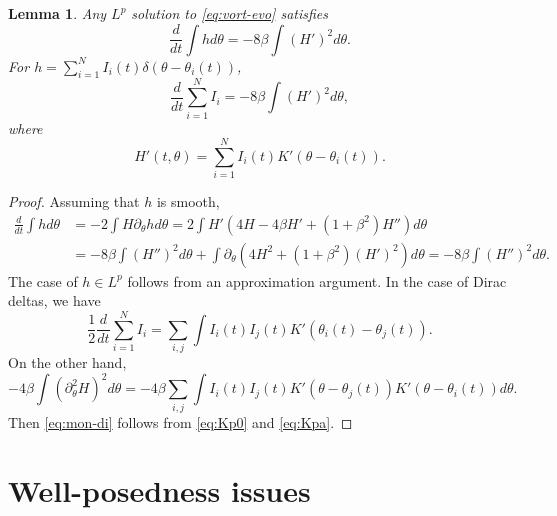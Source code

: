 \documentclass[JEP,XML,SOM,Unicode,NoFloatCountersInSection,published]{cedram}
\theoremstyle{plain}
\newtheorem{lemma}[theorem]{Lemma}
\theoremstyle{definition}
\let\rd\partial
\let\bt\beta
\let\dlt\delta
\let\tht\theta
\begin{document}

\begin{lemma}\label{lem:mon}
Any $L^p$ solution to \eqref{eq:vort-evo} satisfies\vspace*{-3pt}
\begin{equation}\label{eq:mon}
\frac{d}{dt} \int h d\tht = -8\bt \int (H')^2 d\tht.
\end{equation}
For $h = \sum_{i=1}^{N} I_i(t) \dlt(\tht-\tht_i(t))$,\vspace*{-3pt}
\begin{equation}\label{eq:mon-di}
\frac{d}{dt} \sum_{i=1}^{N} I_{i} = - 8\bt \int (H')^2 d\tht,
\end{equation}
where\vspace*{-3pt}
\begin{equation*}
H'(t,\tht) = \sum_{i=1}^{N} I_i(t) K'(\tht-\tht_i(t)).
\end{equation*}
\end{lemma}
\begin{proof}
Assuming that $h$ is smooth,\vspace*{-3pt}
\begin{equation*}
\begin{split}
\frac{d}{dt} \int h d\tht & = -2 \int H\rd_\tht h d\tht = 2\int H' (4H - 4\bt H' + (1+\bt^2) H'') d\tht \\
& = -8\bt \int (H'')^2 d\tht + \int \rd_\tht \left(4H^2 + (1+\bt^2) (H')^2 \right) d\tht = -8\bt \int (H'')^2 d\tht.
\end{split}
\end{equation*}
The case of $h\in L^p$ follows from an approximation argument. In the case of Dirac deltas, we have\vspace*{-3pt}
\begin{equation*}
\frac12 \frac{d}{dt} \sum_{i=1}^{N} I_{i} = \sum_{i,j} \int I_i(t) I_j(t) K'(\tht_i(t)-\tht_j(t)).
\end{equation*}
On the other hand,\vspace*{-3pt}
\begin{equation*}
-4\bt \int (\partial^2_{\theta} H)^2 d\tht = -4\bt \sum_{i,j} \int I_i(t)I_j(t) K'(\tht-\tht_j(t))K'(\tht-\tht_i(t)) d\tht.
\end{equation*}
Then \eqref{eq:mon-di} follows from \eqref{eq:Kp0} and \eqref{eq:Kpa}.
\end{proof}

\section{Well-posedness issues}\label{sec:wp}
\end{document}
